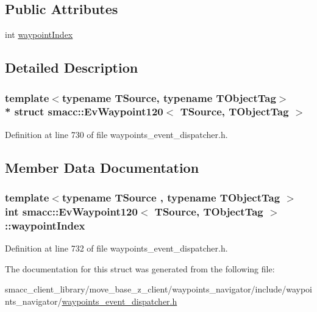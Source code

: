 \subsection*{Public Attributes}
\begin{DoxyCompactItemize}
\item 
int \hyperlink{structsmacc_1_1EvWaypoint120_a2627c4c99493217f083e5f4533bf8e86}{waypoint\+Index}
\end{DoxyCompactItemize}


\subsection{Detailed Description}
\subsubsection*{template$<$typename T\+Source, typename T\+Object\+Tag$>$\\*
struct smacc\+::\+Ev\+Waypoint120$<$ T\+Source, T\+Object\+Tag $>$}



Definition at line 730 of file waypoints\+\_\+event\+\_\+dispatcher.\+h.



\subsection{Member Data Documentation}
\subsubsection[{\texorpdfstring{waypoint\+Index}{waypointIndex}}]{\setlength{\rightskip}{0pt plus 5cm}template$<$typename T\+Source , typename T\+Object\+Tag $>$ int {\bf smacc\+::\+Ev\+Waypoint120}$<$ T\+Source, T\+Object\+Tag $>$\+::waypoint\+Index}\hypertarget{structsmacc_1_1EvWaypoint120_a2627c4c99493217f083e5f4533bf8e86}{}\label{structsmacc_1_1EvWaypoint120_a2627c4c99493217f083e5f4533bf8e86}


Definition at line 732 of file waypoints\+\_\+event\+\_\+dispatcher.\+h.



The documentation for this struct was generated from the following file\+:\begin{DoxyCompactItemize}
\item 
smacc\+\_\+client\+\_\+library/move\+\_\+base\+\_\+z\+\_\+client/waypoints\+\_\+navigator/include/waypoints\+\_\+navigator/\hyperlink{waypoints__event__dispatcher_8h}{waypoints\+\_\+event\+\_\+dispatcher.\+h}\end{DoxyCompactItemize}
